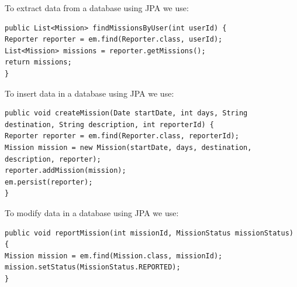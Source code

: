 \begin{example}
    To extract data from a database using JPA we use: 
    \begin{lstlisting}[style=Java]
public List<Mission> findMissionsByUser(int userId) {
Reporter reporter = em.find(Reporter.class, userId);
List<Mission> missions = reporter.getMissions();
return missions;
}
    \end{lstlisting}
    To insert data in a database using JPA we use: 
    \begin{lstlisting}[style=Java]
public void createMission(Date startDate, int days, String destination, String description, int reporterId) {
Reporter reporter = em.find(Reporter.class, reporterId);
Mission mission = new Mission(startDate, days, destination, description, reporter);
reporter.addMission(mission);
em.persist(reporter);
}        
    \end{lstlisting}
    To modify data in a database using JPA we use: 
    \begin{lstlisting}[style=Java]
public void reportMission(int missionId, MissionStatus missionStatus) {
Mission mission = em.find(Mission.class, missionId);
mission.setStatus(MissionStatus.REPORTED);
}
    \end{lstlisting}
\end{example}
